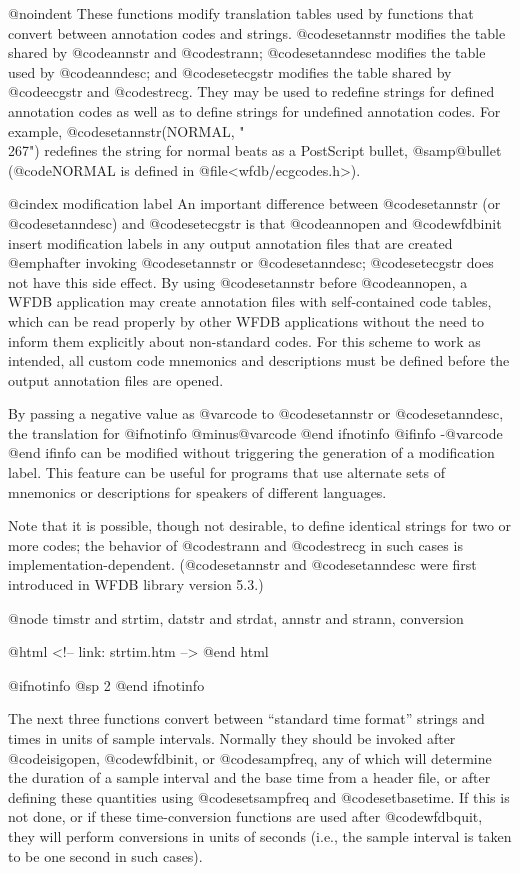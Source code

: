 {{{{{{{{@noindent
These functions modify translation tables used by functions that
convert between annotation codes and strings.  @code{setannstr} modifies
the table shared by @code{annstr} and @code{strann}; @code{setanndesc}
modifies the table used by @code{anndesc}; and @code{setecgstr} modifies
the table shared by @code{ecgstr} and @code{strecg}.  They may be used
to redefine strings for defined annotation codes as well as to define
strings for undefined annotation codes.  For example,
@code{setannstr(NORMAL, "\\267")} redefines the string for normal beats
as a PostScript bullet, @samp{@bullet{}} (@code{NORMAL} is defined in
@file{<wfdb/ecgcodes.h>}).

@cindex modification label
An important difference between @code{setannstr} (or @code{setanndesc})
and @code{setecgstr} is that @code{annopen} and @code{wfdbinit} insert
modification labels in any output annotation files that are created
@emph{after} invoking @code{setannstr} or @code{setanndesc};
@code{setecgstr} does not have this side effect.  By using
@code{setannstr} before @code{annopen}, a WFDB application may create
annotation files with self-contained code tables, which can be read
properly by other WFDB applications without the need to inform them
explicitly about non-standard codes.  For this scheme to work as
intended, all custom code mnemonics and descriptions must be defined
before the output annotation files are opened.

By passing a negative value as @var{code} to @code{setannstr} or
@code{setanndesc}, the translation for
@ifnotinfo
@minus{}@var{code}
@end ifnotinfo
@ifinfo
-@var{code}
@end ifinfo
can be modified without triggering the generation of a modification label.
This feature can be useful for programs that use alternate sets of
mnemonics or descriptions for speakers of different languages.

Note that it is possible, though not desirable, to define identical
strings for two or more codes; the behavior of @code{strann} and
@code{strecg} in such cases is implementation-dependent.
(@code{setannstr} and @code{setanndesc} were first introduced in WFDB
library version 5.3.)

@node     timstr and strtim, datstr and strdat, annstr and strann, conversion

@html
<!-- link: strtim.htm -->
@end html

@ifnotinfo
@sp 2
@end ifnotinfo

The next three functions convert between ``standard time format''
strings and times in units of sample intervals.  Normally they should be
invoked after @code{isigopen}, @code{wfdbinit}, or @code{sampfreq}, any of
which will determine the duration of a sample interval and the base time
from a header file, or after defining these quantities using
@code{setsampfreq} and @code{setbasetime}.  If this is not done, or if
these time-conversion functions are used after @code{wfdbquit}, they will
perform conversions in units of seconds (i.e., the sample interval is
taken to be one second in such cases).

}}}}}}}}
